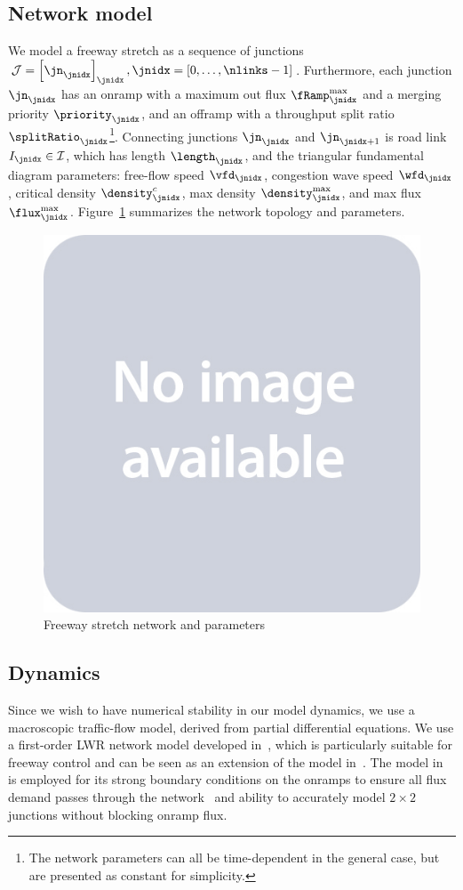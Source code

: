 \subsection{Network model} %
\label{sub:network_model}



We model a freeway stretch as a sequence of junctions $\junctions=\seq{\jn}{\jnidx},\jnidx=\left[0,\ldots,\nlinks -1\right]$.
Furthermore, each junction $\jn_{\jnidx}$ has an onramp with 
a maximum out flux $\rampMax_{\jnidx}$
and a merging priority $\priority_{\jnidx}$, and an offramp with
a throughput split ratio $\splitRatio_{\jnidx}$\footnote{The network parameters can all be time-dependent in the general case, but are presented as constant for simplicity.}. Connecting junctions $\jn_{\jnidx}$ and $\jn_{\jnidx+1}$ is road link $\link_{\jnidx}\in\links$, which has length $\length_\jnidx$, and the triangular fundamental diagram parameters:
free-flow speed $\vfd_{\jnidx}$, 
congestion wave speed $\wfd_{\jnidx}$, 
critical density $\pcfd_{\jnidx}$, 
max density $\pmfd_{\jnidx}$, and
max flux $\fmfd_{\jnidx}$. Figure~\ref{fig:freeway-network} summarizes the network topology and parameters.

\begin{figure}
\centering
\includegraphics[width=.25\columnwidth]{figures/placeholder}
\caption{Freeway stretch network and parameters}
\label{fig:freeway-network}
\end{figure}

\subsection{Dynamics} %
\label{sub:dynamics}

Since we wish to have numerical stability in our model dynamics, we use a macroscopic traffic-flow model, derived from partial differential equations.
We use a first-order LWR \cite{lighthill1955kinematic,richards1956shock} network model developed in~\cite{Monache2013}, which is particularly suitable for freeway control and can be seen as an extension of the model in~\cite{garavello2006traffic}. The model in~\cite{Monache2013} is employed for its strong boundary conditions on the onramps to ensure all flux demand passes through the network~\cite{strub2006weak} and ability to accurately model $2\times2$ junctions without blocking onramp flux.

